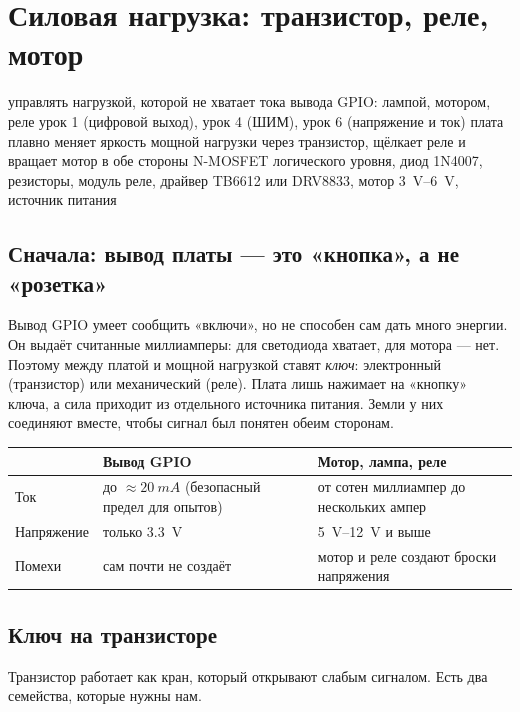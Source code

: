 \section{Силовая нагрузка: транзистор, реле, мотор}
\lessonintro
  {управлять нагрузкой, которой не хватает тока вывода GPIO: лампой, мотором, реле}
  {урок 1 (цифровой выход), урок 4 (ШИМ), урок 6 (напряжение и ток)}
  {плата плавно меняет яркость мощной нагрузки через транзистор, щёлкает реле и вращает мотор в обе стороны}
  {N-MOSFET логического уровня, диод 1N4007, резисторы, модуль реле, драйвер TB6612 или DRV8833, мотор \SIrange{3}{6}{V}, источник питания}

\subsection{Сначала: вывод платы --- это «кнопка», а не «розетка»}

Вывод GPIO умеет сообщить «включи», но не способен сам дать много энергии. Он выдаёт считанные
миллиамперы: для светодиода хватает, для мотора --- нет. Поэтому между платой и мощной нагрузкой ставят
\emph{ключ}: электронный (транзистор) или механический (реле). Плата лишь нажимает на «кнопку» ключа,
а сила приходит из отдельного источника питания. Земли у них соединяют вместе, чтобы сигнал был понятен
обеим сторонам.

\begin{center}\small
\begin{tabularx}{\textwidth}{@{}l X X@{}}
\toprule
 & Вывод GPIO & Мотор, лампа, реле \\
\midrule
Ток & до $\approx\SI{20}{mA}$ (безопасный предел для опытов) & от сотен миллиампер до нескольких ампер \\
Напряжение & только \SI{3.3}{V} & \SIrange{5}{12}{V} и выше \\
Помехи & сам почти не создаёт & мотор и реле создают броски напряжения \\
\bottomrule
\end{tabularx}
\end{center}

\subsection{Ключ на транзисторе}

Транзистор работает как кран, который открывают слабым сигналом. Есть два семейства, которые нужны нам.

